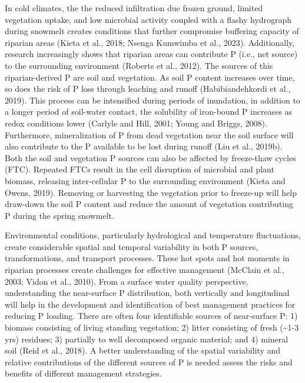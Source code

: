 \documentclass[
]{agujournal2019}
\begin{document}
In cold climates, the the reduced infiltration due frozen ground,
limited vegetation uptake, and low microbial activity coupled with a
flashy hydrograph during snowmelt creates conditions that further
compromise buffering capacity of riparian areas (Kieta et al., 2018;
Nsenga Kumwimba et al., 2023). Additionally, research increasingly shows
that riparian areas can contribute P (i.e., net source) to the
surrounding environment (Roberts et al., 2012). The sources of this
riparian-derived P are soil and vegetation. As soil P content increases
over time, so does the risk of P loss through leaching and runoff
(Habibiandehkordi et al., 2019). This process can be intensified during
periods of inundation, in addition to a longer period of soil-water
contact, the solubility of iron-bound P increases as redox conditions
lower (Carlyle and Hill, 2001; Young and Briggs, 2008). Furthermore,
mineralization of P from dead vegetation near the soil surface will also
contribute to the P available to be lost during runoff (Liu et al.,
2019b). Both the soil and vegetation P sources can also be affected by
freeze-thaw cycles (FTC). Repeated FTCs result in the cell disruption of
microbial and plant biomass, releasing inter-cellular P to the
surrounding environment (Kieta and Owens, 2019). Removing or harvesting
the vegetation prior to freeze-up will help draw-down the soil P content
and reduce the amount of vegetation contributing P during the spring
snowmelt.

Environmental conditions, particularly hydrological and temperature
fluctuations, create considerable spatial and temporal variability in
both P sources, transformations, and transport processes. These hot
spots and hot moments in riparian processes create challenges for
effective management (McClain et al., 2003; Vidon et al., 2010). From a
surface water quality perspective, understanding the near-surface P
distribution, both vertically and longitudinal will help in the
development and identification of best management practices for reducing
P loading. There are often four identifiable sources of near-surface P:
1) biomass consisting of living standing vegetation; 2) litter
consisting of fresh (\textasciitilde1-3 yrs) residues; 3) partially to
well decomposed organic material; and 4) mineral soil (Reid et al.,
2018). A better understanding of the spatial variability and relative
contributions of the different sources of P is needed assess the risks
and benefits of different management strategies.
\end{document}

